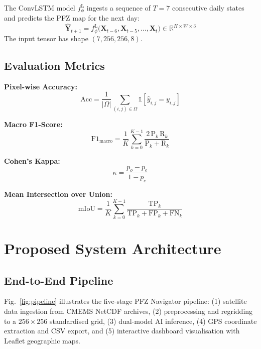 \documentclass[conference]{IEEEtran}
\begin{document}
The ConvLSTM model $f_{\phi}^{\text{L}}$ ingests a sequence of $T = 7$
consecutive daily states and predicts the PFZ map for the next day:
\begin{equation}
\hat{\mathbf{Y}}_{t+1} = f_{\phi}^{\text{L}}
  \bigl(\mathbf{X}_{t-6}, \mathbf{X}_{t-5}, \ldots, \mathbf{X}_t \bigr)
  \in \mathbb{R}^{H \times W \times 3}
\label{eq:convlstm}
\end{equation}
The input tensor has shape $(7, 256, 256, 8)$.

\subsection{Evaluation Metrics}

\textbf{Pixel-wise Accuracy:}
\begin{equation}
\text{Acc} = \frac{1}{|\Omega|}
  \sum_{(i,j) \in \Omega}
  \mathbb{1}\!\left[\hat{y}_{i,j} = y_{i,j}\right]
\label{eq:acc}
\end{equation}

\textbf{Macro F1-Score:}
\begin{equation}
\text{F1}_{\text{macro}} = \frac{1}{K}
  \sum_{k=0}^{K-1}
  \frac{2 \, \text{P}_k \, \text{R}_k}{\text{P}_k + \text{R}_k}
\label{eq:f1}
\end{equation}

\textbf{Cohen's Kappa:}
\begin{equation}
\kappa = \frac{p_o - p_e}{1 - p_e}
\label{eq:kappa}
\end{equation}

\textbf{Mean Intersection over Union:}
\begin{equation}
\text{mIoU} = \frac{1}{K}
  \sum_{k=0}^{K-1}
  \frac{\text{TP}_k}{\text{TP}_k + \text{FP}_k + \text{FN}_k}
\label{eq:miou}
\end{equation}

\section{Proposed System Architecture}

\subsection{End-to-End Pipeline}

Fig.~\ref{fig:pipeline} illustrates the five-stage PFZ Navigator
pipeline: (1) satellite data ingestion from CMEMS NetCDF archives,
(2) preprocessing and regridding to a $256 \times 256$ standardised
grid, (3) dual-model AI inference, (4) GPS coordinate extraction
and CSV export, and (5) interactive dashboard visualisation with
Leaflet geographic maps.
\end{document}
